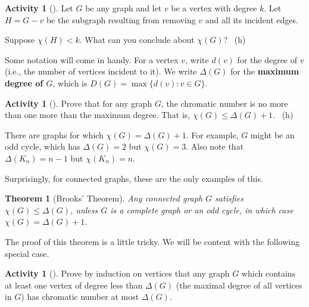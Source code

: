 \documentclass[10pt,]{book}
\newcommand{\terminology}[1]{\textbf{#1}}
\theoremstyle{plain}
\newtheorem{theorem}{Theorem}[section]
\theoremstyle{definition}
\theoremstyle{definition}
\theoremstyle{definition}
\newtheorem{activity}[project]{Activity}
\numberwithin{equation}{chapter}
\def\st{:}
\newcommand{\lt}{<}
\begin{document}
\begin{activity}[]\label{activity-37}
\hypertarget{p-385}{}%
Let \(G\) be any graph and let \(v\) be a vertex with degree \(k\).  Let \(H = G - v\) be the subgraph resulting from removing \(v\) and all its incident edges.%
\par
\hypertarget{p-386}{}%
Suppose \(\chi(H) \lt k\).  What can you conclude about \(\chi(G)\)?%
~{\tiny (h)}\end{activity}
\hypertarget{p-388}{}%
Some notation will come in handy.  For a vertex \(v\), write \(d(v)\) for the degree of \(v\) (i.e., the number of vertices incident to it).  We write \(\Delta(G)\) for the \terminology{maximum degree of \(G\)}, which is \(D(G) = \max\{d(v) \st v \in G\}\).%
\begin{activity}[]\label{activity-38}
\hypertarget{p-389}{}%
Prove that for any graph \(G\), the chromatic number is no more than one more than the maximum degree.  That is, \(\chi(G) \le \Delta(G) + 1\).%
~{\tiny (h)}\end{activity}
\hypertarget{p-391}{}%
There are graphs for which \(\chi(G) = \Delta(G) + 1\).  For example, \(G\) might be an odd cycle, which has \(\Delta(G) = 2\) but \(\chi(G) = 3\).  Also note that \(\Delta(K_n) = n-1\) but \(\chi(K_n) = n\).%
\par
\hypertarget{p-392}{}%
Surprisingly, for connected graphs, these are the only examples of this.%
\begin{theorem}[{Brooks' Theorem}]\label{theorem-6}
\hypertarget{p-393}{}%
 Any connected graph \(G\) satisfies \(\chi(G) \le \Delta(G)\), unless \(G\) is a complete graph or an odd cycle, in which case \(\chi(G) = \Delta(G) + 1\).%
\end{theorem}
\hypertarget{p-394}{}%
The proof of this theorem is a little tricky.  We will be content with the following special case.%
\begin{activity}[]\label{activity-39}
\hypertarget{p-395}{}%
Prove by induction on vertices that any graph \(G\) which contains at least one vertex of degree less than \(\Delta(G)\) (the maximal degree of all vertices in \(G\)) has chromatic number at most \(\Delta(G)\).%
\end{activity}
\typeout{************************************************}
\typeout{************************************************}
\end{document}

